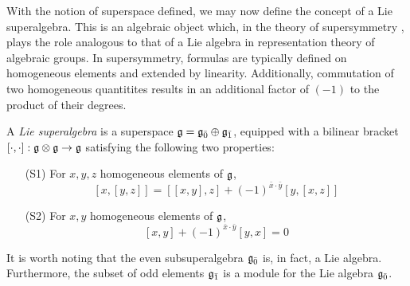 With the notion of superspace defined, we may now define the concept of a Lie superalgebra. This is an algebraic object which, in the theory of supersymmetry \cite{varadarajan}, plays the role analogous to that of a Lie algebra in representation theory of algebraic groups. In supersymmetry, formulas are typically defined on homogeneous elements and extended by linearity. Additionally, commutation of two homogeneous quantitites results in an additional factor of $(-1)$ to the product of their degrees.

\begin{definition}
  A \emph{Lie superalgebra} is a superspace $\mathfrak{g} = {\mathfrak{g}}_{\bar{0}} \oplus {\mathfrak{g}}_{\bar{1}}$, equipped with a bilinear bracket $[\cdot,\cdot]: \mathfrak{g} \otimes \mathfrak{g} \to \mathfrak{g}$ satisfying the following two properties:
  \begin{enumerate}
  \item [(S1)] For $x,y,z$ homogeneous elements of $\mathfrak{g}$,
    \[
      [x,[y,z]] = [[x,y],z] + (-1)^{\bar x \cdot \bar y} [y, [x,z]]
    \]
    
  \item [(S2)] For $x,y$ homogeneous elements of $\mathfrak{g}$,
    \[
      [x,y] + (-1)^{\bar x \cdot \bar y} [y,x] = 0
    \]
    
  \end{enumerate}
\end{definition}

It is worth noting that the even subsuperalgebra ${\mathfrak{g}}_{\bar{0}}$ is, in fact, a Lie algebra. Furthermore, the subset of odd elements ${\mathfrak{g}}_{\bar{1}}$ is a module for the Lie algebra ${\mathfrak{g}}_{\bar{0}}$.

